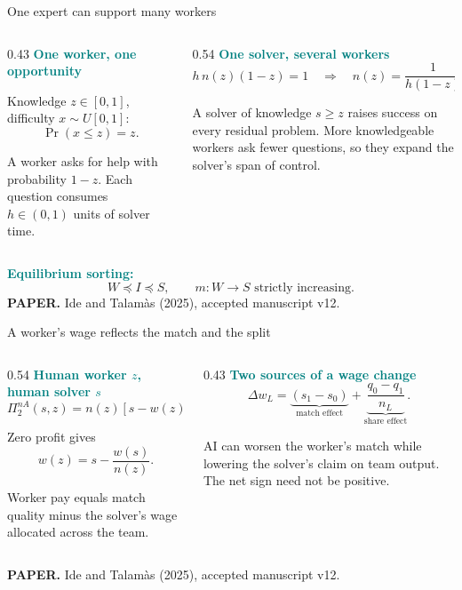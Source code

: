 \documentclass[aspectratio=169,11pt]{beamer}
\newcommand{\key}[1]{\textcolor{Teal}{\textbf{#1}}}
\newcommand{\sourcefoot}{\scriptsize\color{Muted}\textbf{PAPER.} Ide and Talam\`as (2025), accepted manuscript v12.}
\begin{document}
\begin{frame}{One expert can support many workers}
\small
\begin{columns}[T,totalwidth=\textwidth]
\begin{column}{0.43\textwidth}
  \key{One worker, one opportunity}

  Knowledge $z\in[0,1]$, difficulty $x\sim U[0,1]$:
  \[
  \Pr(x\le z)=z.
  \]

  A worker asks for help with probability $1-z$. Each question consumes
  $h\in(0,1)$ units of solver time.
\end{column}
\begin{column}{0.54\textwidth}
  \key{One solver, several workers}
  \[
  h\,n(z)(1-z)=1
  \quad\Longrightarrow\quad
  \boxed{n(z)=\frac{1}{h(1-z)}}.
  \]

  A solver of knowledge $s\ge z$ raises success on every residual problem.
  More knowledgeable workers ask fewer questions, so they expand the solver's
  span of control.
\end{column}
\end{columns}

\vfill
\key{Equilibrium sorting:}
\[
W\preceq I\preceq S,
\qquad m:W\to S\text{ strictly increasing.}
\]
\sourcefoot
\end{frame}

\begin{frame}{A worker's wage reflects the match and the split}
\small
\begin{columns}[T,totalwidth=\textwidth]
\begin{column}{0.54\textwidth}
  \key{Human worker $z$, human solver $s$}
  \[
  \Pi_2^{nA}(s,z)
  =n(z)[s-w(z)]-w(s).
  \]

  Zero profit gives
  \[
  \boxed{w(z)=s-\frac{w(s)}{n(z)}}.
  \]

  Worker pay equals match quality minus the solver's wage allocated across the
  team.
\end{column}
\begin{column}{0.43\textwidth}
  \key{Two sources of a wage change}
  \[
  \Delta w_L
  =\underbrace{(s_1-s_0)}_{\text{match effect}}
  +\underbrace{\frac{q_0-q_1}{n_L}}_{\text{share effect}}.
  \]

  AI can worsen the worker's match while lowering the solver's claim on team
  output. The net sign need not be positive.
\end{column}
\end{columns}

\vfill
\sourcefoot
\end{frame}
\end{document}
